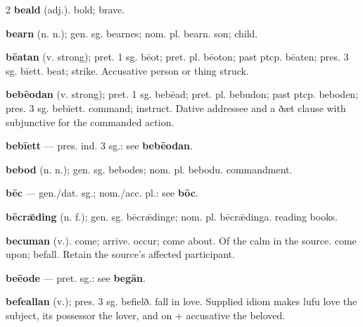 \begin{multicols*}{2}
\textbf{beald} (adj.). bold; brave.\par
\textbf{bearn} (n. n.); gen. sg. bearnes; nom. pl. bearn. son; child.\par
\textbf{bēatan} (v. strong); pret. 1 sg. bēot; pret. pl. bēoton; past ptcp. bēaten; pres. 3 sg. bīett. beat; strike. Accusative person or thing struck.\par
\textbf{bebēodan} (v. strong); pret. 1 sg. bebēad; pret. pl. bebudon; past ptcp. beboden; pres. 3 sg. bebīett. command; instruct. Dative addressee and a ðæt clause with subjunctive for the commanded action.\par
\textbf{bebīett} — pres. ind. 3 sg.: see \textbf{bebēodan}.\par
\textbf{bebod} (n. n.); gen. sg. bebodes; nom. pl. bebodu. commandment.\par
\textbf{bēc} — gen./dat. sg.; nom./acc. pl.: see \textbf{bōc}.\par
\textbf{bēcrǣding} (n. f.); gen. sg. bēcrǣdinge; nom. pl. bēcrǣdinga. reading books.\par
\textbf{becuman} (v.). come; arrive. occur; come about. Of the calm in the source. come upon; befall. Retain the source's affected participant.\par
\textbf{beēode} — pret. sg.: see \textbf{begān}.\par
\textbf{befeallan} (v.); pres. 3 sg. befielð. fall in love. Supplied idiom makes lufu love the subject, its possessor the lover, and on + accusative the beloved.\par

\end{multicols*}
